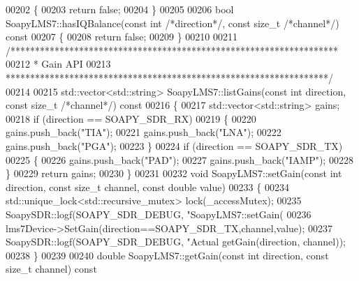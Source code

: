 \begin{DoxyCode}
{{{{{{00202 \textcolor{keyword}{}\{
00203     \textcolor{keywordflow}{return} \textcolor{keyword}{false};
00204 \}
00205 
00206 \textcolor{keywordtype}{bool} SoapyLMS7::hasIQBalance(\textcolor{keyword}{const} \textcolor{keywordtype}{int} \textcolor{comment}{/*direction*/}, \textcolor{keyword}{const} \textcolor{keywordtype}{size\_t} \textcolor{comment}{/*channel*/})\textcolor{keyword}{ const}
00207 \textcolor{keyword}{}\{
00208     \textcolor{keywordflow}{return} \textcolor{keyword}{false};
00209 \}
00210 
00211 \textcolor{comment}{/*******************************************************************}
00212 \textcolor{comment}{ * Gain API}
00213 \textcolor{comment}{ ******************************************************************/}
00214 
00215 std::vector<std::string> SoapyLMS7::listGains(\textcolor{keyword}{const} \textcolor{keywordtype}{int} direction, \textcolor{keyword}{const} \textcolor{keywordtype}{size\_t} \textcolor{comment}{/*channel*/})\textcolor{keyword}{ const}
00216 \textcolor{keyword}{}\{
00217     std::vector<std::string> gains;
00218     \textcolor{keywordflow}{if} (direction == SOAPY\_SDR\_RX)
00219     \{
00220         gains.push\_back(\textcolor{stringliteral}{"TIA"});
00221         gains.push\_back(\textcolor{stringliteral}{"LNA"});
00222         gains.push\_back(\textcolor{stringliteral}{"PGA"});
00223     \}
00224     \textcolor{keywordflow}{if} (direction == SOAPY\_SDR\_TX)
00225     \{
00226         gains.push\_back(\textcolor{stringliteral}{"PAD"});
00227         gains.push\_back(\textcolor{stringliteral}{"IAMP"});
00228     \}
00229     \textcolor{keywordflow}{return} gains;
00230 \}
00231 
00232 \textcolor{keywordtype}{void} SoapyLMS7::setGain(\textcolor{keyword}{const} \textcolor{keywordtype}{int} direction, \textcolor{keyword}{const} \textcolor{keywordtype}{size\_t} channel, \textcolor{keyword}{const} \textcolor{keywordtype}{double} value)
00233 \{
00234     std::unique\_lock<std::recursive\_mutex> lock(_accessMutex);
00235     SoapySDR::logf(SOAPY\_SDR\_DEBUG, \textcolor{stringliteral}{"SoapyLMS7::setGain(%
00236     lms7Device->SetGain(direction==SOAPY\_SDR\_TX,channel,value);
00237     SoapySDR::logf(SOAPY\_SDR\_DEBUG, \textcolor{stringliteral}{"Actual %
      getGain(direction, channel));
00238 \}
00239 
00240 \textcolor{keywordtype}{double} SoapyLMS7::getGain(\textcolor{keyword}{const} \textcolor{keywordtype}{int} direction, \textcolor{keyword}{const} \textcolor{keywordtype}{size\_t} channel)\textcolor{keyword}{ const}
}}}}}}}}
\end{DoxyCode}
